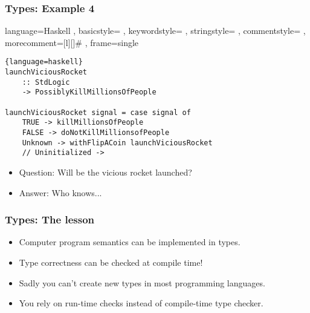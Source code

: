 \documentclass[11pt]{beamer}
\begin{document}
\begin{frame}[fragile]
\frametitle{Types: Example 4}
\lstset
{ language=Haskell
	, basicstyle=\ttfamily\footnotesize
	, keywordstyle=\color{blue}\ttfamily
	, stringstyle=\color{red}\ttfamily
	, commentstyle=\color{green}\ttfamily
	, morecomment=[l][\color{magenta}]{\#}
	, frame=single
}

\begin{lstlisting}{language=haskell}
launchViciousRocket 
    :: StdLogic 
    -> PossiblyKillMillionsOfPeople

launchViciousRocket signal = case signal of
    TRUE -> killMillionsOfPeople
    FALSE -> doNotKillMillionsofPeople
    Unknown -> withFlipACoin launchViciousRocket
    // Uninitialized -> 
\end{lstlisting}	
\begin{itemize}[<+->]
	\item Question: Will be the vicious rocket launched?
	\item Answer: Who knows...
\end{itemize}	
\end{frame}

\begin{frame}
	\frametitle{Types: The lesson}
	\begin{itemize}[<+->]
		\item Computer program semantics can be implemented in types.
		\item Type correctness can be checked at compile time!
		\item Sadly you can't create new types in most programming languages.
		\item You rely on run-time checks instead of compile-time type checker.
	\end{itemize}	
\end{frame}
\end{document}
